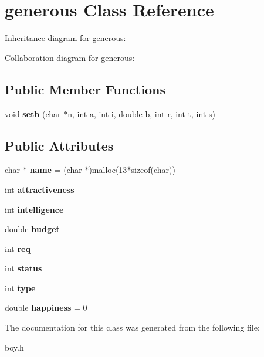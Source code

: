 \hypertarget{classgenerous}{}\section{generous Class Reference}
\label{classgenerous}


Inheritance diagram for generous\+:


Collaboration diagram for generous\+:
\subsection*{Public Member Functions}
\begin{DoxyCompactItemize}
\item 
void {\bfseries setb} (char $\ast$n, int a, int i, double b, int r, int t, int s)\hypertarget{classgenerous_ade694d6653ceeb14fe693ab1b12c732c}{}\label{classgenerous_ade694d6653ceeb14fe693ab1b12c732c}

\end{DoxyCompactItemize}
\subsection*{Public Attributes}
\begin{DoxyCompactItemize}
\item 
char $\ast$ {\bfseries name} = (char $\ast$)malloc(13$\ast$sizeof(char))\hypertarget{classgenerous_affad74947d146885a9ab0d371fabf57f}{}\label{classgenerous_affad74947d146885a9ab0d371fabf57f}

\item 
int {\bfseries attractiveness}\hypertarget{classgenerous_a424ee157f42cacad3763797591c50a82}{}\label{classgenerous_a424ee157f42cacad3763797591c50a82}

\item 
int {\bfseries intelligence}\hypertarget{classgenerous_a5a8f4a88ad4e59645a5eae9fa3db4edb}{}\label{classgenerous_a5a8f4a88ad4e59645a5eae9fa3db4edb}

\item 
double {\bfseries budget}\hypertarget{classgenerous_a19e89063afe631704424490a0df9b2f8}{}\label{classgenerous_a19e89063afe631704424490a0df9b2f8}

\item 
int {\bfseries req}\hypertarget{classgenerous_a6d76e5c2c07769511baeb3f2d0f363f5}{}\label{classgenerous_a6d76e5c2c07769511baeb3f2d0f363f5}

\item 
int {\bfseries status}\hypertarget{classgenerous_aa974a66284c3795d296b12d35ba40f07}{}\label{classgenerous_aa974a66284c3795d296b12d35ba40f07}

\item 
int {\bfseries type}\hypertarget{classgenerous_a4329c15085abe40efe87313b20bbfb72}{}\label{classgenerous_a4329c15085abe40efe87313b20bbfb72}

\item 
double {\bfseries happiness} = 0\hypertarget{classgenerous_a11a4fee32d0e46b50b6a93f91665f4e1}{}\label{classgenerous_a11a4fee32d0e46b50b6a93f91665f4e1}

\end{DoxyCompactItemize}


The documentation for this class was generated from the following file\+:\begin{DoxyCompactItemize}
\item 
boy.\+h\end{DoxyCompactItemize}
